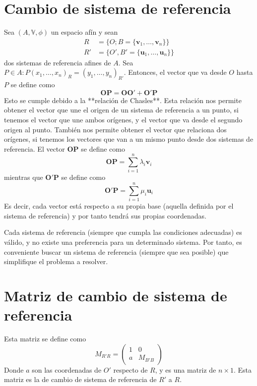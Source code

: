 \documentclass{./Geometria.tex}
\begin{document}
\section{Cambio de sistema de referencia}
Sea $(A,\mathbb{V},\phi)$ un espacio afín y sean
\begin{equation}
	\begin{split}
		R&=\{ O;B=\{ \mathbf{v}_{1},\dots,\mathbf{v}_{n} \} \}\\
		R'&=\{ O',B'=\{ \mathbf{u}_{1},\dots,\mathbf{u}_{n} \}\}
	\end{split}
\end{equation}
dos sistemas de referencia afines de $A$.
Sea $P\in A:P(x_{1},\dots,x_{n})_{R}=(y_{1},\dots,y_{n})_{R'}$.
Entonces, el vector que va desde $O$ hasta $P$ se define como
$$
\boxed{\mathbf{OP}=\mathbf{OO'}+\mathbf{O'P}}
$$
Esto se cumple debido a la **relación de Chasles**.
Esta relación nos permite obtener el vector que une el origen de un sistema de referencia a un punto, si tenemos el vector que une ambos orígenes, y el vector que va desde el segundo origen al punto.
También nos permite obtener el vector que relaciona dos orígenes, si tenemos los vectores que van a un mismo punto desde dos sistemas de referencia.
El vector $\mathbf{OP}$ se define como
$$
\mathbf{OP}=\sum_{i=1}^n\lambda_{i}\mathbf{v}_{i}
$$
mientras que $\mathbf{O'P}$ se define como
$$
\mathbf{O'P}=\sum_{i=1}^n\mu_{i}\mathbf{u}_{i}
$$
Es decir, cada vector está respecto a su propia base (aquella definida por el sistema de referencia) y por tanto tendrá sus propias coordenadas.

\begin{defin}
Cada sistema de referencia (siempre que cumpla las condiciones adecuadas) es válido, y no existe una preferencia para un determinado sistema. Por tanto, es conveniente buscar un sistema de referencia (siempre que sea posible) que simplifique el problema a resolver.
\end{defin}

\section{Matriz de cambio de sistema de referencia}
Esta matriz se define como
$$
M_{R'R}= \begin{pmatrix}
1 & 0 \\
a & M_{B'B}
\end{pmatrix}
$$
Donde $a$ son las coordenadas de $O'$ respecto de $R$, y es una matriz de $n\times 1$.
Esta matriz es la de cambio de sistema de referencia de $R'$ a $R$.
\end{document}

